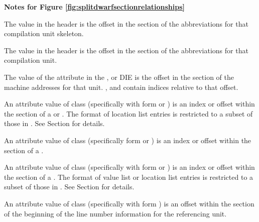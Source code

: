 \clearpage
\begin{center}
   \textbf{Notes for Figure \ref{fig:splitdwarfsectionrelationships}}
\end{center}
\begin{description}

The \HFNdebugabbrevoffset{} value in the header is
the offset in the \dotdebugabbrev{} section of the
abbreviations for that compilation unit skeleton.

The \HFNdebugabbrevoffset{} value in the header
is the offset in the \dotdebugabbrevdwo{} section of the
abbreviations for that compilation unit.

The value of the \DWATaddrbase{} attribute in the
\DWTAGcompileunit, \DWTAGpartialunit{} or \DWTAGtypeunit{} DIE
is the offset in the \dotdebugaddr{} section of the machine
addresses for that unit.
\DWFORMaddrxXN, \DWOPaddrx{} and \DWOPconstx{} contain indices
relative to that offset.

An attribute value of class
\CLASSloclist{} (specifically with form \DWFORMloclistx{}
or \DWFORMsecoffset)
is an index or offset within the \dotdebugloclistsdwo{}
section of a
\bb
{} or
\eb
{}.
The format of \dotdebugloclistsdwo{} location list entries
is restricted to a subset of those in \dotdebugloclists.
See Section  for details.

\bb
An attribute value of class \CLASSrnglist{}
(specifically form \DWFORMrnglistx{} or \DWFORMsecoffset)
is an index or offset within the \dotdebugrnglists{}
section of a .
\eb

An attribute value of class \CLASSrnglist{} (specifically
\DWATranges{} with form \DWFORMrnglistx{} or \DWFORMsecoffset)
is an index or offset within the \dotdebugrnglistsdwo{}
section of a .
The format of \dotdebugrnglistsdwo{}
\bb
value list or
\eb
location list entries
is restricted to a subset of those in \dotdebugrnglists.
See Section  for details.

An attribute value of class \CLASSlineptr{} (specifically
\DWATstmtlist{} with form \DWFORMsecoffset)
is an offset within the \dotdebugline{} section of the
beginning of the line number information for the
referencing unit.


\end{description}
